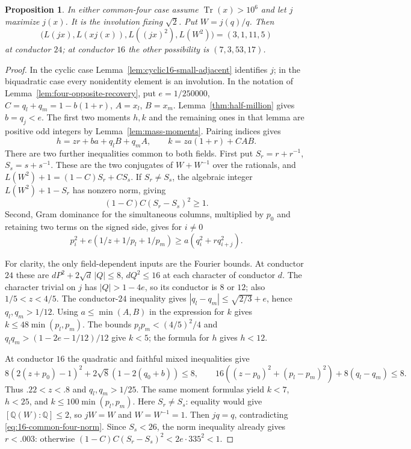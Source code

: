 \documentclass[11pt,reqno]{amsart}
\newtheorem{proposition}[theorem]{Proposition}
\theoremstyle{remark}\newtheorem{remark}[theorem]{Remark}
\numberwithin{equation}{section}
\begin{document}
\begin{proposition}\label{prop:k24-four-small-moments}\label{prop:k16-four-small-moments}
In either common-four case assume $\operatorname{Tr}(x)>10^6$
and let $j$ maximize $j(x)$. It is the
involution fixing $\sqrt2$. Put $W=j(q)/q$. Then
\[
 \bigl(L(jx),L(xj(x)),L((jx)^2),L(W^2)\bigr)
   =(3,1,11,5)
\]
at conductor $24$; at conductor $16$ the other possibility is
$(7,3,53,17)$.
\end{proposition}
\begin{proof}
In the cyclic case Lemma~\ref{lem:cyclic16-small-adjacent} identifies
$j$; in the biquadratic case every nonidentity element is an involution.
In the notation of Lemma~\ref{lem:four-opposite-recovery}, put
$e=1/250000$, $C=q_l+q_m=1-b(1+r)$, $A=x_l$, $B=x_m$.
Lemma~\ref{thm:half-million} gives $b=q_j<e$. The first two
moments $h,k$ and the remaining ones in that lemma are positive odd
integers by Lemma~\ref{lem:mass-moments}. Pairing indices gives
\[
 h=zr+ba+q_lB+q_mA,\qquad k=za(1+r)+CAB.
\]
There are two further inequalities common to both fields. First put
$S_r=r+r^{-1}$, $S_s=s+s^{-1}$. These are the two conjugates of
$W+W^{-1}$ over the rationals, and
$L(W^2)+1=(1-C)S_r+CS_s$. If $S_r\ne S_s$, the algebraic integer
$L(W^2)+1-S_r$ has nonzero norm, giving
\[
       (1-C)C(S_r-S_s)^2\ge1.
\]
Second, Gram dominance for the simultaneous columns, multiplied by
$p_0$ and retaining two terms on the signed side, gives for $i\ne0$
\[
 p_i^2+e(1/z+1/p_l+1/p_m)\ge a(q_i^2+r q_{i+j}^2).
\]

For clarity, the only field-dependent inputs are the Fourier bounds.
At conductor $24$ these are $dP^2+2\sqrt d\,|Q|\le8$,
$dQ^2\le16$ at each character of conductor $d$. The character
trivial on $j$ has $|Q|>1-4e$, so its conductor is $8$ or $12$;
also $1/5<z<4/5$. The conductor-$24$ inequality gives
$|q_l-q_m|\le\sqrt{2/3}+e$, hence $q_l,q_m>1/12$.
Using $a\le\min(A,B)$ in the expression for $k$ gives
$k\le48\min(p_l,p_m)$. The bounds
$p_lp_m<(4/5)^2/4$ and $q_lq_m>(1-2e-1/12)/12$ give $k<5$;
the formula for $h$ gives $h<12$.

At conductor $16$ the quadratic and faithful mixed inequalities give
\[
 8(2(z+p_0)-1)^2+2\sqrt8(1-2(q_0+b))\le8,\qquad
 16((z-p_0)^2+(p_l-p_m)^2)+8(q_l-q_m)\le8.
\]
Thus $.22<z<.8$ and $q_l,q_m>1/25$. The same moment formulas yield
$k<7$, $h<25$, and $k\le100\min(p_l,p_m)$.
Here $S_r\ne S_s$: equality would give $[\mathbb Q(W):\mathbb Q]\le2$,
so $jW=W$ and $W=W^{-1}=1$. Then $jq=q$, contradicting \eqref{eq:16-common-four-norm}.
Since $S_s<26$, the norm inequality already gives $r<.003$:
otherwise $(1-C)C(S_r-S_s)^2<2e\cdot335^2<1$.


\end{proof}
\end{document}
